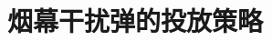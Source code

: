 \title{烟幕干扰弹的投放策略}

\baominghao{}
\schoolname{}
\membera{}
\memberb{}
\memberc{}
\supervisor{}
\dayinput{}
